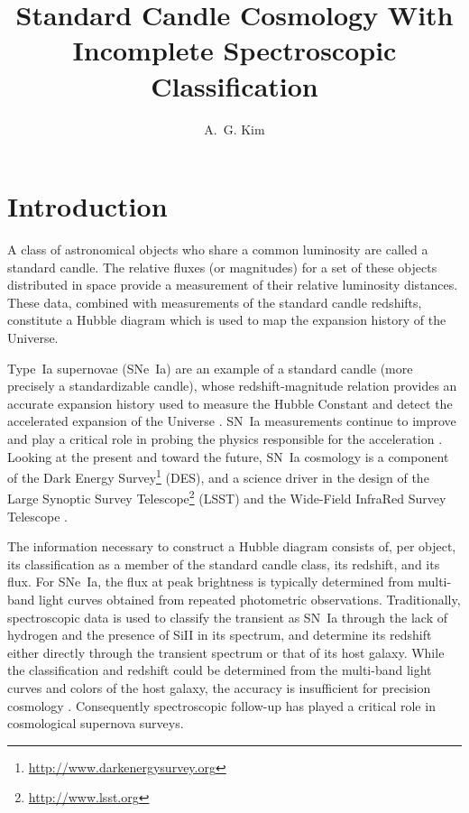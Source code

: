 \documentclass[preprint,3p]{elsarticle}
\begin{document}
\begin{frontmatter}

\title{Standard Candle Cosmology With Incomplete Spectroscopic Classification}
\author{A.~G. Kim}
\address{Physics Division, Lawrence Berkeley National Laboratory, 1 Cyclotron Road, Berkeley CA, USA 94720}

\begin{abstract}
\end{abstract}
\begin{keyword}
\end{keyword}
\end{frontmatter}

\section{Introduction}
A class of astronomical objects who share a common luminosity are called a standard
candle.  The relative fluxes (or magnitudes) for a set of these objects distributed in space
provide a measurement of their relative luminosity distances. These data, combined with
measurements of the standard candle redshifts, constitute a Hubble
diagram which is used to map the expansion history of the Universe.

Type~Ia supernovae (SNe~Ia) are an example of a standard candle (more precisely a standardizable
candle), whose redshift-magnitude relation provides an accurate expansion history
used to measure the Hubble Constant
\citep{2001ApJ...553...47F} and detect the accelerated expansion of the Universe
\citep{1998AJ....116.1009R, 1999ApJ...517..565P}.  SN~Ia measurements continue
to improve 
\citep{2014A&A...568A..22B} and play a critical role in probing the physics
responsible for the acceleration \citep{2013PhR...530...87W}.
Looking at the present and toward the future, SN~Ia cosmology is
a component of the Dark Energy Survey\footnote{\url{http://www.darkenergysurvey.org}} (DES),
and a science driver in the design of the
Large Synoptic Survey Telescope\footnote{\url{http://www.lsst.org}} (LSST)
and the Wide-Field InfraRed Survey Telescope
\citep{2015arXiv150303757S}.

The information necessary to construct a Hubble diagram consists of, per object,
its classification as a
member of the standard candle class, its redshift, and its flux.  For SNe~Ia, the flux at
peak brightness is typically determined from multi-band light curves obtained from repeated
photometric observations. Traditionally, spectroscopic data is used to classify the transient
as SN~Ia through the lack of hydrogen and the presence of SiII in its spectrum,
and determine its redshift either directly through the transient spectrum or that of its host
galaxy. While the classification and redshift could be determined from the multi-band
light curves and colors of the host galaxy, the accuracy is insufficient for precision
cosmology \citep{2011ApJ...738..162S}.  Consequently spectroscopic follow-up
has played a critical role in cosmological supernova surveys.
\end{document}
